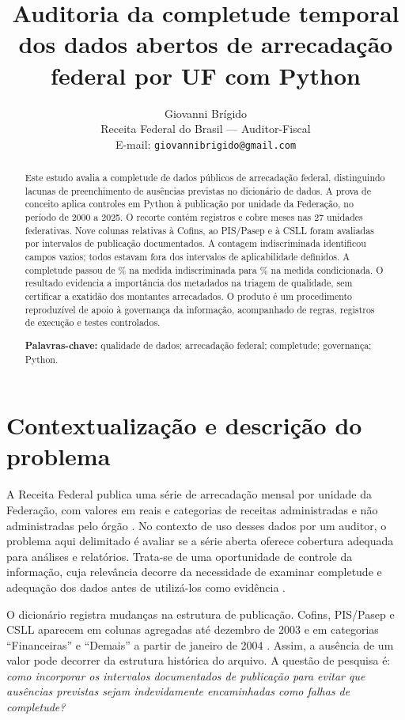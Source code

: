 \documentclass[12pt,a4paper]{article}
\title{Auditoria da completude temporal dos dados abertos de arrecadação federal por UF com Python}
\author{Giovanni Brígido\\
\small Receita Federal do Brasil --- Auditor-Fiscal\\
\small E-mail: \texttt{giovannibrigido@gmail.com}}
\date{}
\begin{document}
\maketitle
\begin{abstract}
Este estudo avalia a completude de dados públicos de arrecadação federal,
distinguindo lacunas de preenchimento de ausências previstas no dicionário de
dados. A prova de conceito aplica controles em Python à publicação por unidade
da Federação, no período de 2000 a 2025. O recorte contém \NRegistros{}
registros e cobre \NMeses{} meses nas 27 unidades federativas. Nove colunas
relativas à Cofins, ao PIS/Pasep e à CSLL foram avaliadas por intervalos de
publicação documentados. A contagem indiscriminada identificou \NAusencias{}
campos vazios; todos estavam fora dos intervalos de aplicabilidade definidos.
A completude passou de \CIngenua{}\% na medida indiscriminada para
\CCondicionada{}\% na medida condicionada. O resultado evidencia a importância
dos metadados na triagem de qualidade, sem certificar a exatidão dos montantes
arrecadados. O produto é um procedimento reproduzível de apoio à governança
da informação, acompanhado de regras, registros de execução e testes controlados.

\noindent\textbf{Palavras-chave:} qualidade de dados; arrecadação federal;
completude; governança; Python.
\end{abstract}

\section{Contextualização e descrição do problema}
A Receita Federal publica uma série de arrecadação mensal por unidade da
Federação, com valores em reais e categorias de receitas administradas e não
administradas pelo órgão \cite{rfbDados,rfbDicionario}. No contexto de uso desses
dados por um auditor, o problema aqui delimitado é avaliar se a série aberta
oferece cobertura adequada para análises e relatórios. Trata-se de uma
oportunidade de controle da informação, cuja relevância decorre da necessidade
de examinar completude e adequação dos dados antes de utilizá-los como evidência
\cite{gao2019}.

O dicionário registra mudanças na estrutura de publicação. Cofins, PIS/Pasep e
CSLL aparecem em colunas agregadas até dezembro de 2003 e em categorias
``Financeiras'' e ``Demais'' a partir de janeiro de 2004
\cite{rfbDicionario}. Assim, a ausência de um valor pode decorrer da estrutura
histórica do arquivo. A questão de pesquisa é: \textit{como incorporar os
intervalos documentados de publicação para evitar que ausências previstas
sejam indevidamente encaminhadas como falhas de completude?}
\end{document}
